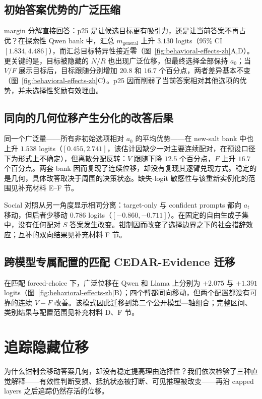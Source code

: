 \documentclass[UTF8,letterpaper,10pt,twocolumn]{ctexart}
\begin{document}
\subsection{初始答案优势的广泛压缩}

margin 分解直接回答：p25 是让候选目标更有吸引力，还是让当前答案不再占优？在探索性 Qwen bank 中，汇总 $m_{\mathrm{general}}$ 上升 $3.130$ logits（95\% CI $[1.834,4.486]$），而汇总目标特异性接近零（图~\ref{fig:behavioral-effects-zh}A,D）。更关键的是，目标被隐藏的 $N/R$ 也出现广泛位移，但最终选择全部保持 $a_0$；当 $V/F$ 展示目标后，目标跟随分别增加 $20.8$ 和 $16.7$ 个百分点，两者差异基本不变（图~\ref{fig:behavioral-effects-zh}C）。p25 因而削弱了当前答案相对其他选项的优势，并未选择性奖励有效理由。

\subsection{同向的几何位移产生分化的改答后果}

同一个广泛量——所有非初始选项相对 $a_0$ 的平均优势——在 new-salt bank 中也上升 $1.538$ logits（$[0.455,2.741]$，该估计因缺少一对主要连续配对，在预设口径下为形式上不确定），但离散分配反转：$V$ 跟随下降 $12.5$ 个百分点，$F$ 上升 $16.7$ 个百分点。两套 bank 因而复现了连续位移，却没有复现其逐臂兑现方式。稳定的是几何，具体改答取决于周围的决策状态。缺失-logit 敏感性与该重新实例化的范围见补充材料 E--F 节。

Social 对照从另一角度显示相同分离：target-only 与 confident prompts 都向 $a_t$ 移动，但后者少移动 $0.786$ logits（$[-0.860,-0.711]$）。在固定的自由生成子集中，没有任何配对 $S$ 答案发生改变。钳制因而改变了选择边界之下的社会措辞效应；互补的双向结果见补充材料 F 节。

\subsection{跨模型专属配置的匹配 CEDAR-Evidence 迁移}

在匹配 forced-choice 下，广泛位移在 Qwen 和 Llama 上分别为 $+2.075$ 与 $+1.391$ logits（图~\ref{fig:behavioral-effects-zh}B）；四个臂都同向移动，但两个配置都没有可靠的连续 $V-F$ 改善。该模式因此迁移到第二个公开模型—轴组合；完整区间、类别结果与配置范围见补充材料 D、F 节。

\section{追踪隐藏位移}
\label{sec:diagnosis-zh}

为什么钳制会移动答案几何，却没有稳定提高理由选择性？我们依次检验了三种直觉解释——有效性判断受损、抵抗状态被打断、可见推理被改变——再沿 capped layers 之后追踪仍然存活的位移。
\end{document}
